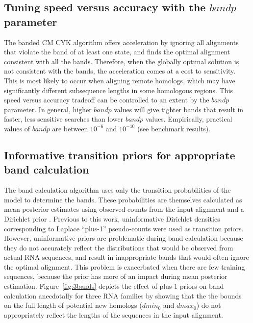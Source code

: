 \documentclass[11pt]{article}
\begin{document}
\subsection{Tuning speed versus accuracy with the $bandp$ parameter}
The banded CM CYK algorithm offers acceleration by ignoring all
alignments that violate the band of at least one state, and finds
the optimal alignment consistent with all the bands. Therefore, when
the globally optimal solution is not consistent with the bands, the
acceleration comes at a cost to sensitivity. This is most likely to
occur when aligning remote homologs, which may have significantly
different subsequence lengths in some homologous regions. This 
speed versus
accuracy tradeoff can be controlled to an extent by the $bandp$
parameter. In general, higher $bandp$ values will give tighter bands
that result in faster, less sensitive searches than lower $bandp$ values.
Empirically, practical values of $bandp$ are between $10^{-6}$ and
$10^{-10}$ (see benchmark results). 

\subsection{Informative transition priors for appropriate band calculation}

The band calculation algorithm uses only the transition probabilities
of the model to determine the bands. These probabilities are
themselves calculated as mean posterior estimates using
observed counts from the input alignment and a Dirichlet prior
\cite{infguide03}. Previous to this work, uninformative Dirichlet
densities corresponding to Laplace ``plus-1'' pseudo-counts were used
as transition priors. However, uninformative priors are
problematic during band calculation because they do not accurately
reflect the distributions that would be observed from actual RNA
sequences, and result in inappropriate bands that would often ignore
the optimal alignment.  This problem is exacerbated when there are few
training sequences, because the prior has more of an impact during
mean posterior estimation. 
Figure~\ref{fig:3bands} depicts the effect of plus-1 priors on band
calculation anecdotally for three RNA families by showing that the
the bounds on the full length of potential new homologs ($dmin_0$ and $dmax_0$)
do not appropriately reflect the lengths of the sequences
in the input alignment. 
\end{document}
